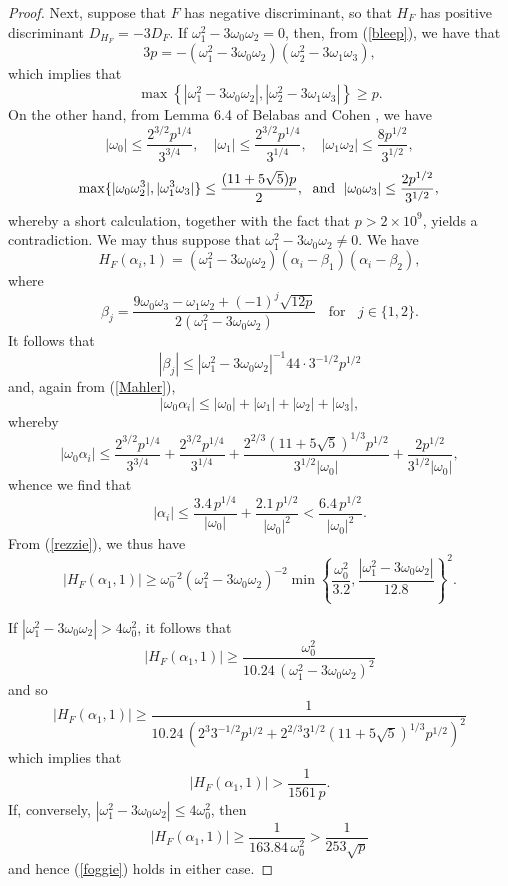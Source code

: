 \begin{proof}
Next, suppose that $F$ has negative discriminant, so that $H_F$ has positive discriminant $D_{H_F}=-3 D_F$.  
If $\omega_1^2-3\omega_0 \omega_2=0$, then, from (\ref{bleep}), we have that
$$
3 p = - (\omega_1^2-3\omega_0 \omega_2) (\omega_2^2 - 3 \omega_1 \omega_3),
$$
which implies that
$$
\max \left\{ |\omega_1^2-3\omega_0 \omega_2|, |\omega_2^2 - 3 \omega_1 \omega_3| \right\} \geq p.
$$
On the other hand, from Lemma 6.4 of Belabas and Cohen \cite{BeCo}, we have
\begin{equation} \label{iota}
|\omega_0| \leq \frac{2^{3/2} p^{1/4}}{3^{3/4}}, \quad 
|\omega_1| \leq \frac{2^{3/2} p^{1/4}}{3^{1/4}}, \quad
|\omega_1 \omega_2| \leq \frac{8 p^{1/2}}{3^{1/2}},
\end{equation}
\begin{equation} \label{iota2}
\max \{ |\omega_0 \omega_2^3|, |\omega_1^3 \omega_3| \} \leq \frac{(11+5 \sqrt{5}) p}{2}, 
 \; \mbox{ and } \;
|\omega_0 \omega_3| \leq \frac{2 p^{1/2}}{3^{1/2}}, \\
\end{equation}
whereby a short calculation, together with the fact that $p > 2 \times 10^9$, yields a contradiction.
We may thus suppose that $\omega_1^2-3\omega_0 \omega_2 \neq 0$. We have
$$
H_F(\alpha_i,1) =  (\omega_1^2-3\omega_0 \omega_2)  \left(\alpha_i - \beta_1 \right) \left( \alpha_i - \beta_2 \right),
$$
where
$$
\beta_j = \frac{9 \omega_0 \omega_3 - \omega_1 \omega_2 + (-1)^j \sqrt{12 p}}{2 (\omega_1^2-3\omega_0 \omega_2)} \; \; \mbox{ for } \; \; j \in \{ 1, 2 \}.
$$
It follows that
$$
|\beta_j| \leq |\omega_1^2-3\omega_0 \omega_2|^{-1} 44 \cdot 3^{-1/2} p^{1/2}
$$
and, again from (\ref{Mahler}),
$$
|\omega_0 \alpha_i| \leq |\omega_0|+|\omega_1|+|\omega_2|+|\omega_3|,
$$
whereby
$$
|\omega_0 \alpha_i| \leq \frac{2^{3/2} p^{1/4}}{3^{3/4}}+\frac{2^{3/2} p^{1/4}}{3^{1/4}}+\frac{2^{2/3} \left(11+5 \sqrt{5} \right)^{1/3} p^{1/2}}{3^{1/2} |\omega_0|}+\frac{2 p^{1/2}}{3^{1/2}|\omega_0|},
$$
whence we find that
$$
|\alpha_i| \leq \frac{3.4 \, p^{1/4}}{|\omega_0|} + \frac{2.1 \, p^{1/2}}{|\omega_0|^2} < \frac{6.4 \, p^{1/2}}{|\omega_0|^2}.
$$
From (\ref{rezzie}), we thus have 
$$
\left|  H_F (\alpha_1,1)  \right| \geq  \omega_0^{-2} (\omega_1^2-3\omega_0 \omega_2)^{-2} \min \left\{ \frac{\omega_0^2}{3.2}, \frac{|\omega_1^2-3\omega_0 \omega_2|}{12.8} \right\}^{2}.
$$

If $|\omega_1^2-3\omega_0 \omega_2| > 4 \omega_0^2$, it follows that
$$
\left|  H_F (\alpha_1,1)  \right| \geq \frac{\omega_0^2}{10.24 \, (\omega_1^2-3\omega_0 \omega_2)^{2}}
$$
and so
$$
\left|  H_F (\alpha_1,1)  \right| \geq \frac{1}{10.24 \, (2^3 3^{-1/2} p^{1/2}+2^{2/3} 3^{1/2} \left(11+5 \sqrt{5} \right)^{1/3} p^{1/2})^{2}}
$$
which implies that
\begin{equation} \label{foggie}
\left|  H_F (\alpha_1,1)  \right| > \frac{1}{1561 \, p}.
\end{equation}
If, conversely, $|\omega_1^2-3\omega_0 \omega_2| \leq 4 \omega_0^2$, then
$$
\left|  H_F (\alpha_1,1)  \right| \geq \frac{1}{163.84 \, \omega_0^2} > \frac{1}{253 \sqrt{p}}
$$
and hence (\ref{foggie}) holds in either case.


\end{proof}
